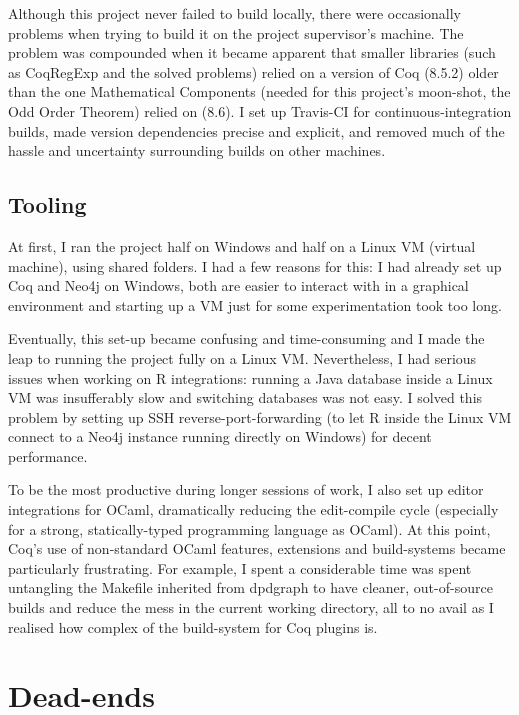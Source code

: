 Although this project never failed to build locally, there were occasionally
problems when trying to build it on the project supervisor's machine. The
problem was compounded when it became apparent that smaller libraries (such as
CoqRegExp and the solved problems) relied on a version of Coq (8.5.2) older than
the one Mathematical Components (needed for this project's moon-shot, the Odd
Order Theorem) relied on (8.6). I set up Travis-CI for continuous-integration
builds, made version dependencies precise and explicit, and removed much of the
hassle and uncertainty surrounding builds on other machines.

\subsection{Tooling}

At first, I ran the project half on Windows and half on a Linux VM (virtual
machine), using shared folders. I had a few reasons for this: I had already set
up Coq and Neo4j on Windows, both are easier to interact with in a graphical
environment and starting up a VM just for some experimentation took too long.

Eventually, this set-up became confusing and time-consuming and I made the leap
to running the project fully on a Linux VM. Nevertheless, I had serious issues
when working on R integrations: running a Java database inside a Linux VM was
insufferably slow and switching databases was not easy. I solved this problem by
setting up SSH reverse-port-forwarding (to let R inside the Linux VM connect to
a Neo4j instance running directly on Windows) for decent performance.

To be the most productive during longer sessions of work, I also set up editor
integrations for OCaml, dramatically reducing the edit-compile cycle (especially
for a strong, statically-typed programming language as OCaml). At this point,
Coq's use of non-standard OCaml features, extensions and build-systems became
particularly frustrating. For example, I spent a considerable time was spent
untangling the Makefile inherited from dpdgraph to have cleaner, out-of-source
builds and reduce the mess in the current working directory, all to no avail as
I realised how complex of the build-system for Coq plugins is.

\section{Dead-ends}

